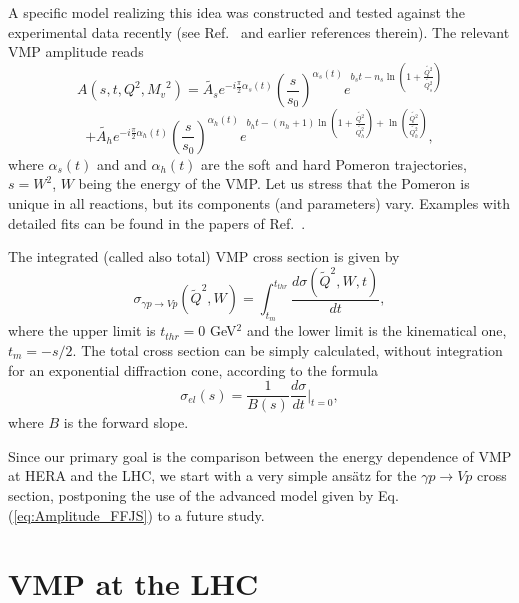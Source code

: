 \documentclass[12pt]{article}
\begin{document}
A specific model realizing this idea was constructed and tested against the experimental data recently (see
Ref.~\cite{FFJS} and earlier references therein). The relevant VMP amplitude reads 
  $$
   A(s,t,Q^2,{M_v}^2)= \widetilde{A_s}e^{-i\frac{\pi}{2}\alpha_s(t)}\left(\frac{s}{s_{0}}\right)^{\alpha_s(t)}
    e^{b_st - n_s\ln{\left(1+\frac{\widetilde{Q^2}}{\widetilde{Q_s^2}}\right)}}
  $$
  \begin{equation}
  +\widetilde{A_h}e^{-i\frac{\pi}{2}\alpha_h(t)}\left(\frac{s}{s_{0}}\right)^{\alpha_h(t)}
    e^{b_ht - (n_h+1)\ln{\left(1+\frac{\widetilde{Q^2}}{\widetilde{Q_h^2}}\right)}
    +\ln{\left(\frac{\widetilde{Q^2}}{\widetilde{Q_h^2}}\right)} },
    \label{eq:Amplitude_FFJS}
    \end{equation}
 where  $\alpha_s(t)$ and and $\alpha_h(t)$ are the soft and hard Pomeron trajectories, $s=W^2$, $W$ being the energy of the VMP. Let us 
stress that the Pomeron is unique in all reactions, but its components (and parameters) vary. 
Examples with detailed fits can be found in the papers of Ref.~\cite{FFJS}.

The integrated (called also total) VMP cross section is given by 
\begin{equation}
\sigma_{\gamma p\rightarrow Vp}(\widetilde Q^2, W)=\int_{t_m}^{t_{thr}}\frac{d\sigma(\widetilde Q^2, W, t)}{dt},
\label{total}
\end{equation} 
where the upper limit is $t_{thr} = 0$ GeV$^2$ and the lower limit is the kinematical one, $t_m = -s/2$. The total cross section 
can be simply calculated, without integration for an exponential diffraction cone, according to the formula
\begin{equation}
\sigma_{el}(s)=\frac{1}{B(s)}\frac{d\sigma}{dt}\biggr\rvert_{t=0},
\label{elastic}
\end{equation}
where $B$ is the forward slope. 

Since our primary goal is the comparison between the energy dependence of VMP at HERA and the LHC, we start with a very simple ans\"atz for the $\gamma p\rightarrow Vp$ cross section, postponing the use of the advanced model given by  
Eq. (\ref{eq:Amplitude_FFJS}) to a future study.

\section{VMP at the LHC} 
\end{document}
